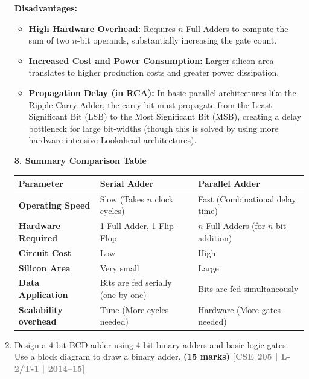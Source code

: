 \documentclass[12pt,a3paper]{article}
\newcommand{\yr}[1]{\hfill\textcolor{gray}{\small\textbf{[#1]}}}
\newcommand{\mk}[1]{\textcolor{orange!70!black}{\small\textbf{(#1 marks)}}}
\begin{document}
\begin{enumerate}
\begin{tcolorbox}[enhanced,breakable,ansbox,colback=cD!4,colframe=cD,boxrule=0.8pt,arc=5pt,title={\textbf{Answer}},fonttitle=\bfseries\color{white},colbacktitle=cD]
\textbf{Disadvantages:}
\begin{itemize}
    \item \textbf{High Hardware Overhead:} Requires $n$ Full Adders to compute the sum of two $n$-bit operands, substantially increasing the gate count.
    \item \textbf{Increased Cost and Power Consumption:} Larger silicon area translates to higher production costs and greater power dissipation.
    \item \textbf{Propagation Delay (in RCA):} In basic parallel architectures like the Ripple Carry Adder, the carry bit must propagate from the Least Significant Bit (LSB) to the Most Significant Bit (MSB), creating a delay bottleneck for large bit-widths (though this is solved by using more hardware-intensive Lookahead architectures).
\end{itemize}

\vspace{1em}
\textbf{\textcolor{cD}{3. Summary Comparison Table}}

\begin{center}
\renewcommand{\arraystretch}{1.4}
\begin{tabular}{@{}lll@{}}
\toprule
\textbf{Parameter} & \textbf{Serial Adder} & \textbf{Parallel Adder} \\
\midrule
\textbf{Operating Speed} & Slow (Takes $n$ clock cycles) & Fast (Combinational delay time) \\
\textbf{Hardware Required} & 1 Full Adder, 1 Flip-Flop & $n$ Full Adders (for $n$-bit addition) \\
\textbf{Circuit Cost} & Low & High \\
\textbf{Silicon Area} & Very small & Large \\
\textbf{Data Application} & Bits are fed serially (one by one) & Bits are fed simultaneously \\
\textbf{Scalability overhead} & Time (More cycles needed) & Hardware (More gates needed) \\
\bottomrule
\end{tabular}
\end{center}

\end{tcolorbox}

\item Design a 4-bit BCD adder using 4-bit binary adders and basic logic gates. Use a block diagram to draw a binary adder.
\mk{15} \yr{CSE 205 | L-2/T-1 | 2014--15}

\begin{tcolorbox}[enhanced,breakable,ansbox,colback=cD!4,colframe=cD,boxrule=0.8pt,arc=5pt,title={\textbf{Answer}},fonttitle=\bfseries\color{white},colbacktitle=cD]


\end{tcolorbox}
\end{enumerate}
\end{document}
